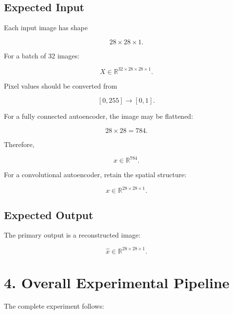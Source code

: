 \documentclass[10pt]{article}
\begin{document}
\subsection*{Expected Input}

Each input image has shape

\[
28\times28\times1.
\]

For a batch of 32 images:

\[
X\in\mathbb{R}^{32\times28\times28\times1}.
\]

Pixel values should be converted from

\[
[0,255]\rightarrow[0,1].
\]

For a fully connected autoencoder, the image may be flattened:

\[
28\times28=784.
\]

Therefore,

\[
x\in\mathbb{R}^{784}.
\]

For a convolutional autoencoder, retain the spatial structure:

\[
x\in\mathbb{R}^{28\times28\times1}.
\]

\subsection*{Expected Output}

The primary output is a reconstructed image:

\[
\hat{x}\in\mathbb{R}^{28\times28\times1}.
\]

\section*{4. Overall Experimental Pipeline}

The complete experiment follows:

\begin{center}
\end{center}
\end{document}
